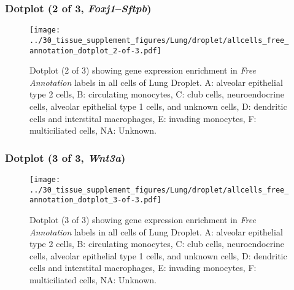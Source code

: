 \clearpage

\subsubsection{Dotplot (2 of 3, \emph{Foxj1}--\emph{Sftpb})}
\begin{figure}[h]
\centering
\texttt{[image: ../30\_tissue\_supplement\_figures/Lung/droplet/allcells\_free\_annotation\_dotplot\_2-of-3.pdf]}

\caption{ Dotplot (2 of 3)  showing gene expression enrichment in \emph{Free Annotation} labels in all cells of Lung Droplet. A: alveolar epithelial type 2 cells, B: circulating monocytes, C: club cells, neuroendocrine cells, alveolar epithelial type 1 cells, and unknown cells, D: dendritic cells and interstital macrophages, E: invading monocytes, F: multiciliated cells, NA: Unknown.}
\end{figure}


\clearpage

\subsubsection{Dotplot (3 of 3, \emph{Wnt3a})}
\begin{figure}[h]
\centering
\texttt{[image: ../30\_tissue\_supplement\_figures/Lung/droplet/allcells\_free\_annotation\_dotplot\_3-of-3.pdf]}

\caption{ Dotplot (3 of 3)  showing gene expression enrichment in \emph{Free Annotation} labels in all cells of Lung Droplet. A: alveolar epithelial type 2 cells, B: circulating monocytes, C: club cells, neuroendocrine cells, alveolar epithelial type 1 cells, and unknown cells, D: dendritic cells and interstital macrophages, E: invading monocytes, F: multiciliated cells, NA: Unknown.}
\end{figure}

